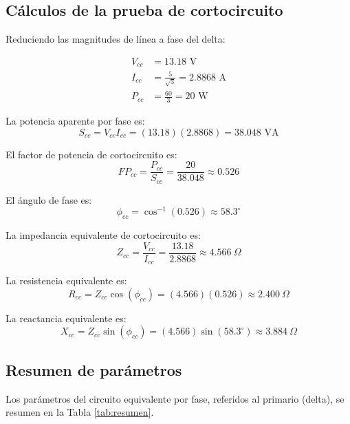 \documentclass[conference]{IEEEtran}
\begin{document}
\subsection{Cálculos de la prueba de cortocircuito}

Reduciendo las magnitudes de línea a fase del delta:

\begin{align}
V_{cc} &= 13.18 \text{ V} \\
I_{cc} &= \frac{5}{\sqrt{3}} = 2.8868 \text{ A} \\
P_{cc} &= \frac{60}{3} = 20 \text{ W}
\end{align}

La potencia aparente por fase es:
\begin{equation}
S_{cc} = V_{cc} I_{cc} = (13.18)(2.8868) = 38.048 \text{ VA}
\end{equation}

El factor de potencia de cortocircuito es:
\begin{equation}
FP_{cc} = \frac{P_{cc}}{S_{cc}} = \frac{20}{38.048} \approx 0.526
\end{equation}

El ángulo de fase es:
\begin{equation}
\phi_{cc} = \cos^{-1}(0.526) \approx 58.3^\circ
\end{equation}

La impedancia equivalente de cortocircuito es:
\begin{equation}
Z_{cc} = \frac{V_{cc}}{I_{cc}} = \frac{13.18}{2.8868} \approx 4.566 \ \Omega
\end{equation}

La resistencia equivalente es:
\begin{equation}
R_{cc} = Z_{cc}\cos(\phi_{cc}) = (4.566)(0.526) \approx 2.400 \ \Omega
\end{equation}

La reactancia equivalente es:
\begin{equation}
X_{cc} = Z_{cc}\sin(\phi_{cc}) = (4.566)\sin(58.3^\circ) \approx 3.884 \ \Omega
\end{equation}

\subsection{Resumen de parámetros}

Los parámetros del circuito equivalente por fase, referidos al primario (delta),
se resumen en la Tabla \ref{tab:resumen}.
\end{document}
